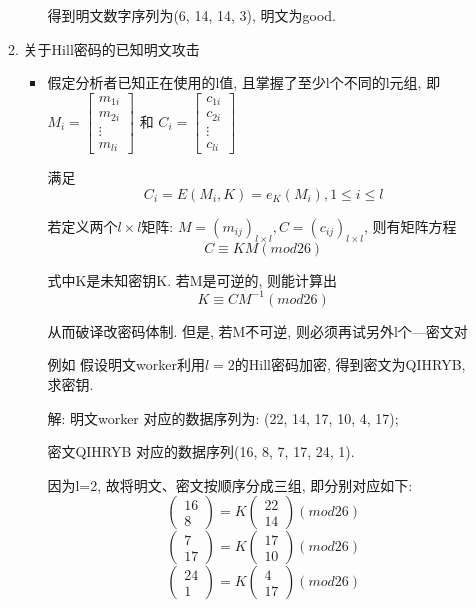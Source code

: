 \documentclass[UTF8]{ctexart}
\begin{document}
\begin{itemize}
\begin{enumerate}
\begin{itemize}
                    得到明文数字序列为(6, 14, 14, 3), 明文为good.
            \end{itemize}

            \item 关于Hill密码的已知明文攻击
            \begin{itemize}
                \item 假定分析者已知正在使用的l值, 且掌握了至少l个不同的l元组, 即
                $M_i=\left[ \begin{array}{c}{m_{1i}}\\ {m_{2i}}\\ \vdots\\ {m_{li}} \end{array}\right]$ 和
                    $C_i=\left[ \begin{array}{c}{c_{1i}}\\ {c_{2i}}\\ \vdots \\ {c_{li}} \end{array}\right]$

                满足
                $$C_i=E(M_i, K)=e_K(M_i), 1\le i\le l$$

                若定义两个$l\times l$矩阵: $M=(m_{ij})_{l\times l}, C=(c_{ij})_{l\times l}$, 则有矩阵方程
                $$C\equiv KM(mod 26)$$

                式中K是未知密钥K. 若M是可逆的, 则能计算出
                $$K\equiv CM^{-1}(mod 26)$$

                从而破译改密码体制. 但是, 若M不可逆, 则必须再试另外l个---密文对

                例如 假设明文worker利用$l=2$的Hill密码加密, 得到密文为QIHRYB, 求密钥.

                解: 明文worker 对应的数据序列为: (22, 14, 17, 10, 4, 17);

                密文QIHRYB 对应的数据序列(16, 8, 7, 17, 24, 1).

                因为l=2, 故将明文、密文按顺序分成三组, 即分别对应如下:
                $$\left( \begin{array}{c}{16}\\ {8} \end{array}\right)=K\left( \begin{array}{c}{22}\\ {14} \end{array}\right)(mod 26)$$
                $$\left( \begin{array}{c}{7}\\ {17} \end{array}\right)=K\left( \begin{array}{c}{17}\\ {10} \end{array}\right)(mod 26)$$
                $$\left( \begin{array}{c}{24}\\ {1} \end{array}\right)=K\left( \begin{array}{c}{4}\\ {17} \end{array}\right)(mod 26)$$


\end{itemize}
\end{enumerate}
\end{itemize}
\end{document}
